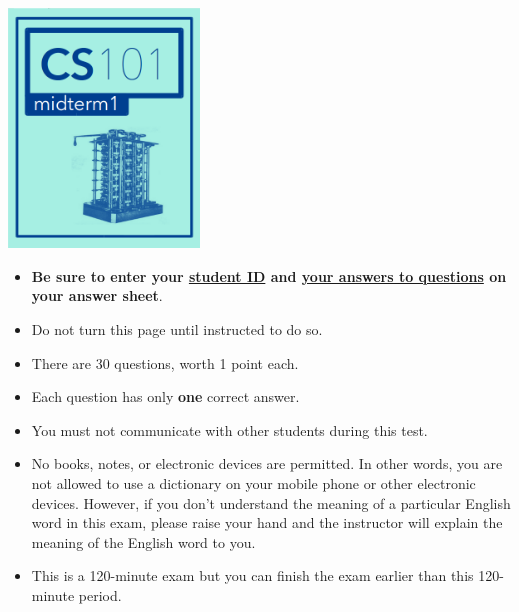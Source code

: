 \documentclass{article}
\newcounter{question}
\begin{document}
	
	\newcount\maxrawpages
	\newcount\maxpadpages
	\newcount\minpadpages
	\newcount\padcount
	
	\cleardoublepage
	
	\setcounter{page}{1}
	
	
	\begin{center}
		\includegraphics[width=2in]{../img/midterm1-header.png}
	\end{center}
	
	\bigskip
	\noindent
	\begin{itemize}
		\item \textbf{Be sure to enter your \underline{student ID} and \underline{your answers to questions} on your answer sheet}.
		\item Do not turn this page until instructed to do so.
		\item There are 30 questions, worth 1 point each.
		\item Each question has only \textbf{one} correct answer.
		\item You must not communicate with other students during this test.
		\item No books, notes, or electronic devices are permitted. In other words, you are not allowed to use a dictionary on your mobile phone or other electronic devices. However, if you don't understand the meaning of a particular English word in this exam, please raise your hand and the instructor will explain the meaning of the English word to you. 
		\item This is a 120-minute exam but you can finish the exam earlier than this 120-minute period.
	\end{itemize}
\end{document}

